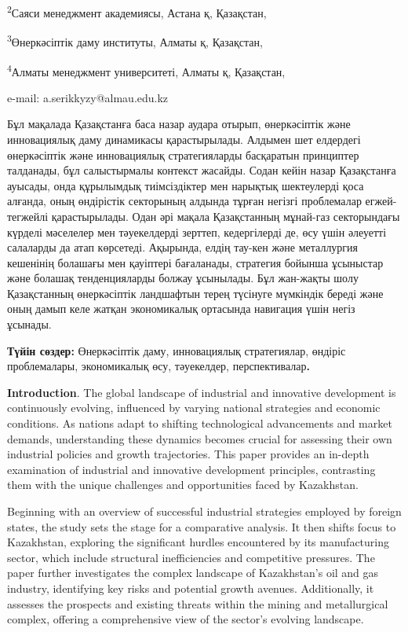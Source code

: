\textsuperscript{2}Саяси менеджмент академиясы, Астана қ, Қазақстан,

\textsuperscript{3}Өнеркәсіптік даму институты, Алматы қ, Қазақстан,

\textsuperscript{4}Алматы менеджмент университеті, Алматы қ, Қазақстан,

e-mail: a.serikkyzy@almau.edu.kz

Бұл мақалада Қазақстанға баса назар аудара отырып, өнеркәсіптік және
инновациялық даму динамикасы қарастырылады. Алдымен шет елдердегі
өнеркәсіптік және инновациялық стратегияларды басқаратын принциптер
талданады, бұл салыстырмалы контекст жасайды. Содан кейін назар
Қазақстанға ауысады, онда құрылымдық тиімсіздіктер мен нарықтық
шектеулерді қоса алғанда, оның өндірістік секторының алдында тұрған
негізгі проблемалар егжей-тегжейлі қарастырылады. Одан әрі мақала
Қазақстанның мұнай-газ секторындағы күрделі мәселелер мен тәуекелдерді
зерттеп, кедергілерді де, өсу үшін әлеуетті салаларды да атап көрсетеді.
Ақырында, елдің тау-кен және металлургия кешенінің болашағы мен
қауіптері бағаланады, стратегия бойынша ұсыныстар және болашақ
тенденцияларды болжау ұсынылады. Бұл жан-жақты шолу Қазақстанның
өнеркәсіптік ландшафтын терең түсінуге мүмкіндік береді және оның дамып
келе жатқан экономикалық ортасында навигация үшін негіз ұсынады.

{\bfseries Түйін сөздер:} Өнеркәсіптік даму, инновациялық стратегиялар,
өндіріс проблемалары, экономикалық өсу, тәуекелдер,
перспективалар{\bfseries .}

{\bfseries Introduction}. The global landscape of industrial and innovative
development is continuously evolving, influenced by varying national
strategies and economic conditions. As nations adapt to shifting
technological advancements and market demands, understanding these
dynamics becomes crucial for assessing their own industrial policies and
growth trajectories. This paper provides an in-depth examination of
industrial and innovative development principles, contrasting them with
the unique challenges and opportunities faced by Kazakhstan.

Beginning with an overview of successful industrial strategies employed
by foreign states, the study sets the stage for a comparative analysis.
It then shifts focus to Kazakhstan, exploring the significant hurdles
encountered by its manufacturing sector, which include structural
inefficiencies and competitive pressures. The paper further investigates
the complex landscape of Kazakhstan's oil and gas industry, identifying
key risks and potential growth avenues. Additionally, it assesses the
prospects and existing threats within the mining and metallurgical
complex, offering a comprehensive view of the sector's evolving
landscape.

